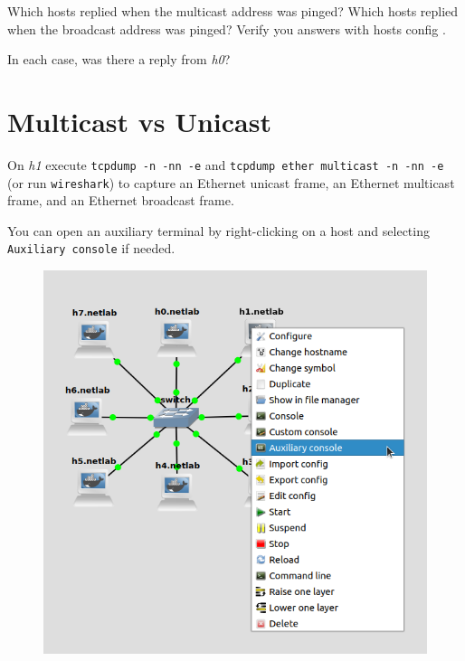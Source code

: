 \documentclass{../UTNetLab}
\begin{document}

\begin{report}
    \item Which hosts replied when the multicast address was pinged?
    Which hosts replied when the broadcast address was pinged?
    Verify you answers with hosts config .

    \item In each case, was there a reply from \textit{h0}?
\end{report}

\section{Multicast vs Unicast\label{sec:multicast-vs-unicast}}
On \textit{h1} execute \lstinline{tcpdump -n -nn -e} and \lstinline{tcpdump ether multicast -n -nn -e} (or run \lstinline{wireshark}) to capture an Ethernet unicast frame, an Ethernet multicast frame, and an Ethernet broadcast frame.

You can open an auxiliary terminal by right-clicking on a host and selecting \texttt{Auxiliary console} if needed.
\begin{figure}[H]
    \centering
    \includegraphics[scale=1.6]{img/auxiliary}
\end{figure}
\end{document}
